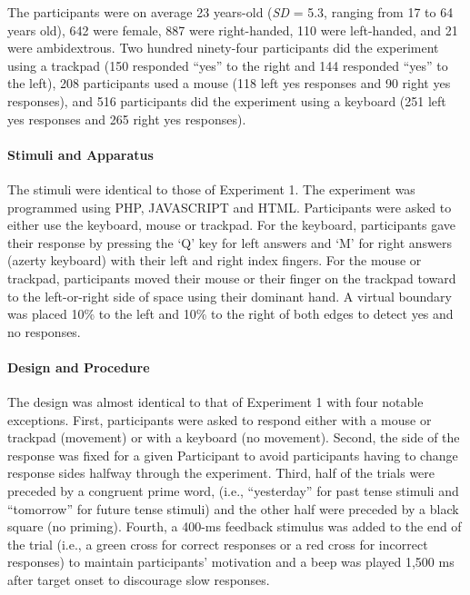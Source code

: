 \documentclass[
  a4paper,12pt,twoside,onecolumn,openright,final,oldfontcommands]{memoir}
\begin{document}
The participants were on average 23 years-old (\emph{SD} = 5.3, ranging from 17 to 64 years old), 642 were female, 887 were right-handed, 110 were left-handed, and 21 were ambidextrous. Two hundred ninety-four participants did the experiment using a trackpad (150 responded ``yes'' to the right and 144 responded ``yes'' to the left), 208 participants used a mouse (118 left yes responses and 90 right yes responses), and 516 participants did the experiment using a keyboard (251 left yes responses and 265 right yes responses).

\hypertarget{stimuli-and-apparatus}{%
\paragraph{Stimuli and Apparatus}\label{stimuli-and-apparatus}}

The stimuli were identical to those of Experiment 1. The experiment was programmed using PHP, JAVASCRIPT and HTML. Participants were asked to either use the keyboard, mouse or trackpad. For the keyboard, participants gave their response by pressing the `Q' key for left answers and `M' for right answers (azerty keyboard) with their left and right index fingers. For the mouse or trackpad, participants moved their mouse or their finger on the trackpad toward to the left-or-right side of space using their dominant hand. A virtual boundary was placed 10\% to the left and 10\% to the right of both edges to detect yes and no responses.

\hypertarget{design-and-procedure}{%
\paragraph{Design and Procedure}\label{design-and-procedure}}

The design was almost identical to that of Experiment 1 with four notable exceptions. First, participants were asked to respond either with a mouse or trackpad (movement) or with a keyboard (no movement). Second, the side of the response was fixed for a given Participant to avoid participants having to change response sides halfway through the experiment. Third, half of the trials were preceded by a congruent prime word, (i.e., ``yesterday'' for past tense stimuli and ``tomorrow'' for future tense stimuli) and the other half were preceded by a black square (no priming). Fourth, a 400-ms feedback stimulus was added to the end of the trial (i.e., a green cross for correct responses or a red cross for incorrect responses) to maintain participants' motivation and a beep was played 1,500 ms after target onset to discourage slow responses.
\end{document}
